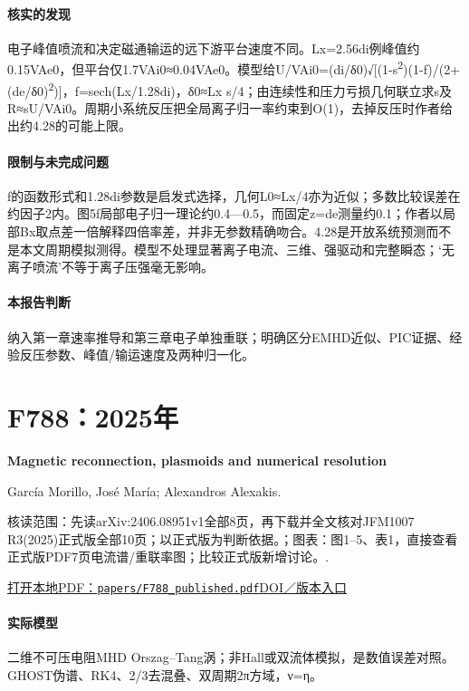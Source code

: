 \paragraph{核实的发现}电子峰值喷流和决定磁通输运的远下游平台速度不同。Lx=2.56di例峰值约0.15VAe0，但平台仅1.7VAi0≈0.04VAe0。模型给U/VAi0=(di/δ0)√[(1-s\textsuperscript{2})(1-f)/(2+(de/δ0)\textsuperscript{2})]，f=sech(Lx/1.28di)，δ0≈Lx s/4；由连续性和压力亏损几何联立求s及R≈sU/VAi0。周期小系统反压把全局离子归一率约束到O(1)，去掉反压时作者给出约4.28的可能上限。

\paragraph{限制与未完成问题}f的函数形式和1.28di参数是启发式选择，几何L0≈Lx/4亦为近似；多数比较误差在约因子2内。图5f局部电子归一理论约0.4—0.5，而固定z=de测量约0.1；作者以局部Bx取点差一倍解释四倍率差，并非无参数精确吻合。4.28是开放系统预测而不是本文周期模拟测得。模型不处理显著离子电流、三维、强驱动和完整瞬态；‘无离子喷流’不等于离子压强毫无影响。

\paragraph{本报告判断}纳入第一章速率推导和第三章电子单独重联；明确区分EMHD近似、PIC证据、经验反压参数、峰值/输运速度及两种归一化。

\section{F788：2025年}\label{paper:F788}

\textbf{Magnetic reconnection,  plasmoids and numerical resolution}\citep{F788}\

García Morillo,  José María;  Alexandros Alexakis.

\textsf{核读范围：}先读arXiv:2406.08951v1全部8页，再下载并全文核对JFM1007 R3(2025)正式版全部10页；以正式版为判断依据。；\textsf{图表：}图1–5、表1，直接查看正式版PDF7页电流谱/重联率图；比较正式版新增讨论。.

\href{run:papers/F788_published.pdf}{打开本地PDF：\texttt{papers/F788\_published.pdf}}\quad\href{https://doi.org/10.1017/jfm.2025.109}{DOI／版本入口}

\paragraph{实际模型}二维不可压电阻MHD Orszag–Tang涡；非Hall或双流体模拟，是数值误差对照。GHOST伪谱、RK4、2/3去混叠、双周期2π方域，ν=η。

